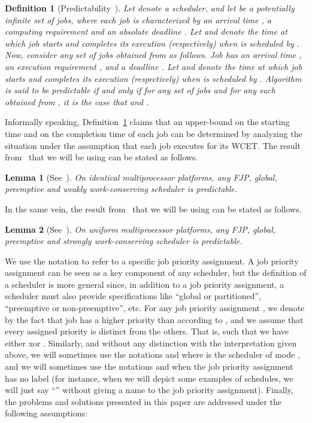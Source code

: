 \documentclass{article}
\newtheorem{Definition}{Definition}
\newtheorem{validity test}{Validity Test}
\newtheorem{Lemma}{Lemma}
\begin{document}
\begin{Definition}[Predictability~\cite{HaLiu:94}]
\label{def:Multimode:predictability}
Let  denote a scheduler, and let  be a potentially infinite set of jobs, where each job  is characterized by an arrival time , a computing requirement  and an absolute deadline . Let  and  denote the time at which job  starts and completes its execution (respectively) when  is scheduled by . Now, consider any set  of jobs obtained from  as follows. Job  has an arrival time , an execution requirement , and a deadline . Let  and  denote the time at which job  starts and completes its execution (respectively) when  is scheduled by . Algorithm  is said to be predictable if and only if for any set of jobs  and for any such  obtained from , it is the case that  and  . 
\end{Definition}

Informally speaking, Definition~\ref{def:Multimode:predictability} claims that an upper-bound on the starting time and on the completion time of each job can be determined by analyzing the situation under the assumption that each job executes for its WCET. The result from~\cite{Ha:95, HaLiu:94, HaLiu:93} that we will be using can be stated as follows. 

\begin{Lemma}[See~\cite{Ha:95, HaLiu:94, HaLiu:93}]
\label{lem:Multimode:weakly_schedulers_predictable}
On identical multiprocessor platforms, any FJP, global, preemptive and weakly work-conserving scheduler is predictable. 
\end{Lemma}

In the same vein, the result from~\cite{CucuGoossens:10} that we will be using can be stated as follows. 

\begin{Lemma}[See~\cite{CucuGoossens:10}]
\label{lem:Multimode:strongly_schedulers_predictable}
On uniform multiprocessor platforms, any FJP, global, preemptive and strongly work-conserving scheduler is predictable.  
\end{Lemma}

We use the notation  to refer to a specific job priority assignment. A job priority assignment can be seen as a key component of any scheduler, but the definition of a scheduler is more general since, in addition to a job priority assignment, a scheduler must also provide specifications like ``global or partitioned'', ``preemptive or non-preemptive'', etc. For any job priority assignment , we denote by  the fact that job  has a higher priority than  according to , and we assume that every assigned priority is distinct from the others. That is,  such that  we have either  xor . Similarly, and without any distinction with the interpretation given above, we will sometimes use the notations  and  where  is the scheduler of mode , and we will sometimes use the notations  and  when the job priority assignment has no label (for instance, when we will depict some examples of schedules, we will just say ``'' without giving a name to the job priority assignment). Finally, the problems and solutions presented in this paper are addressed under the following assumptions:
\end{document}
